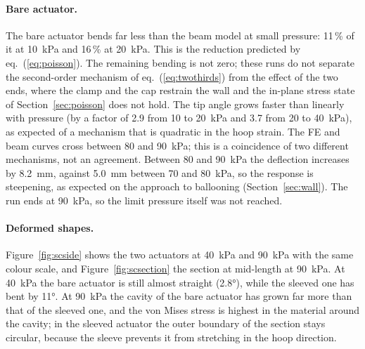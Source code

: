 \documentclass[12pt,a4paper,oneside]{report}
\numberwithin{equation}{chapter}
\numberwithin{figure}{chapter}
\numberwithin{table}{chapter}
\begin{document}
\paragraph{Bare actuator.} The bare actuator bends far less than the beam model at small pressure: 11\,\% of
it at \SI{10}{kPa} and 16\,\% at \SI{20}{kPa}. This is the reduction predicted by eq.~(\ref{eq:poisson}). The
remaining bending is not zero; these runs do not separate the second-order mechanism of
eq.~(\ref{eq:twothirds}) from the effect of the two ends, where the clamp and the cap restrain the wall and
the in-plane stress state of Section~\ref{sec:poisson} does not hold. The tip angle grows faster than
linearly with pressure (by a factor of 2.9 from 10 to \SI{20}{kPa} and 3.7 from 20 to \SI{40}{kPa}), as expected
of a mechanism that is quadratic in the hoop strain. The FE and beam curves cross between 80 and
\SI{90}{kPa}; this is a coincidence of two different mechanisms, not an agreement. Between 80 and
\SI{90}{kPa} the deflection increases by \SI{8.2}{mm}, against \SI{5.0}{mm} between 70 and \SI{80}{kPa}, so
the response is steepening, as expected on the approach to ballooning (Section~\ref{sec:wall}). The run ends
at \SI{90}{kPa}, so the limit pressure itself was not reached.

\paragraph{Deformed shapes.} Figure~\ref{fig:scside} shows the two actuators at \SI{40}{kPa} and
\SI{90}{kPa} with the same colour scale, and Figure~\ref{fig:scsection} the section at mid-length at
\SI{90}{kPa}. At \SI{40}{kPa} the bare actuator is still almost straight (\ang{2.8}), while the sleeved one has
bent by \ang{11}. At \SI{90}{kPa} the cavity of the bare actuator has grown far more than that of the sleeved
one, and the von Mises stress is highest in the material around the cavity; in the sleeved actuator the
outer boundary of the section stays circular, because the sleeve prevents it from stretching in the hoop
direction.
\end{document}
